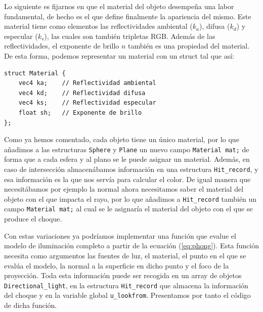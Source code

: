Lo siguiente es fijarnos en que el material del objeto desempeña una labor fundamental, de hecho es el que define finalmente la apariencia del mismo. Este material tiene como elementos las reflectividades ambiental ($k_a$), difusa ($k_d$) y especular ($k_s$), las cuales son también tripletas RGB. Además de las reflectividades, el exponente de brillo $n$ también es una propiedad del material. De esta forma, podemos representar un material con un struct tal que así:

\begin{lstlisting}
struct Material {
    vec4 ka;    // Reflectividad ambiental
    vec4 kd;    // Reflectividad difusa
    vec4 ks;    // Reflectividad especular
    float sh;   // Exponente de brillo
};
\end{lstlisting}

Como ya hemos comentado, cada objeto tiene un único material, por lo que añadimos a las estructuras \verb|Sphere| y \verb|Plane| un nuevo campo \verb|Material mat;| de forma que a cada esfera y al plano se le puede asignar un material. Además, en caso de intersección almacenábamos información en una estructura \verb|Hit_record|, y esa información es la que nos servía para calcular el color. De igual manera que necesitábamos por ejemplo la normal ahora necesitamos saber el material del objeto con el que impacta el rayo, por lo que añadimos a \verb|Hit_record| también un campo \verb|Material mat;| al cual se le asignaría el material del objeto con el que se produce el choque.

Con estas variaciones ya podríamos implementar una función que evalue el modelo de iluminación completo a partir de la ecuación (\ref{eq:phong}). Esta función necesita como argumentos las fuentes de luz, el material, el punto en el que se evalúa el modelo, la normal a la superficie en dicho punto y el foco de la proyección. Toda esta información puede ser recogida en un array de objetos \verb|Directional_light|, en la estructura \verb|Hit_record| que almacena la información del choque y en la variable global \verb|u_lookfrom|. Presentamos por tanto el código de dicha función.


